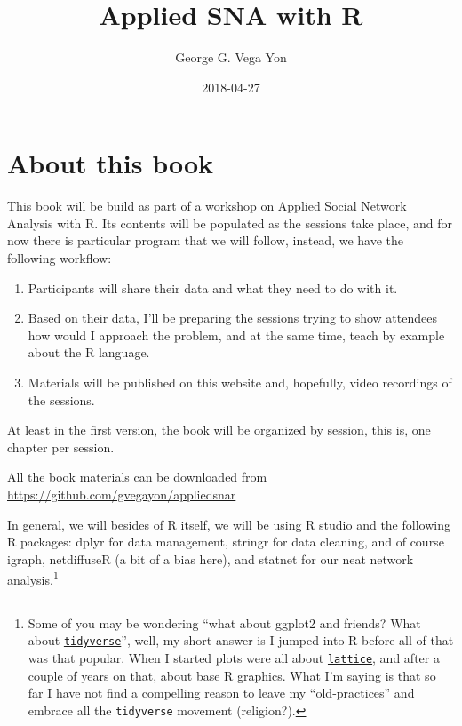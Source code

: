\documentclass[]{book}
\title{Applied SNA with R}
\author{George G. Vega Yon}
\date{2018-04-27}
\let\rmarkdownfootnote\footnote%
\def\footnote{\protect\rmarkdownfootnote}
\theoremstyle{definition}
\theoremstyle{definition}
\theoremstyle{definition}
\theoremstyle{remark}
\begin{document}
\maketitle

{
\setcounter{tocdepth}{1}
\tableofcontents
}
\renewcommand{\Pr}[1]{\mbox{Pr}\left(#1\right)}
\renewcommand{\exp}[1]{\mbox{exp}\left\{#1\right\}}

\chapter{About this book}\label{about-this-book}

This book will be build as part of a workshop on Applied Social Network
Analysis with R. Its contents will be populated as the sessions take
place, and for now there is particular program that we will follow,
instead, we have the following workflow:

\begin{enumerate}
\def\labelenumi{\arabic{enumi}.}
\item
  Participants will share their data and what they need to do with it.
\item
  Based on their data, I'll be preparing the sessions trying to show
  attendees how would I approach the problem, and at the same time,
  teach by example about the R language.
\item
  Materials will be published on this website and, hopefully, video
  recordings of the sessions.
\end{enumerate}

At least in the first version, the book will be organized by session,
this is, one chapter per session.

All the book materials can be downloaded from
\url{https://github.com/gvegayon/appliedsnar}

In general, we will besides of R itself, we will be using R studio and
the following R packages: dplyr for data management, stringr for data
cleaning, and of course igraph, netdiffuseR (a bit of a bias here), and
statnet for our neat network analysis.\footnote{Some of you may be
  wondering ``what about ggplot2 and friends? What about
  \href{https://www.tidyverse.org/}{\texttt{tidyverse}}'', well, my
  short answer is I jumped into R before all of that was that popular.
  When I started plots were all about
  \href{https://CRAN.R-project.org/package=lattice}{\texttt{lattice}},
  and after a couple of years on that, about base R graphics. What I'm
  saying is that so far I have not find a compelling reason to leave my
  ``old-practices'' and embrace all the \texttt{tidyverse} movement
  (religion?).}
\end{document}
